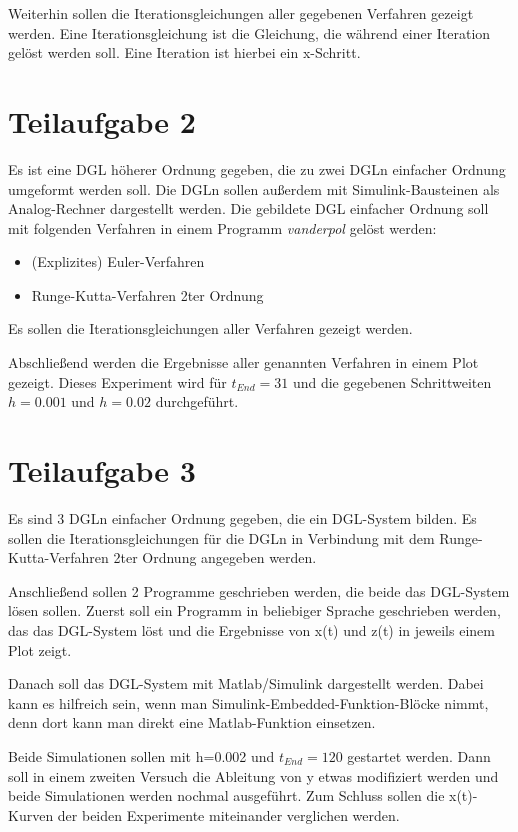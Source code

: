 \documentclass[]{scrartcl}
\begin{document}
Weiterhin sollen die Iterationsgleichungen aller gegebenen Verfahren gezeigt werden. Eine Iterationsgleichung ist die Gleichung, die während einer Iteration gelöst werden soll. Eine Iteration ist hierbei ein x-Schritt.

\section{Teilaufgabe 2}
Es ist eine DGL höherer Ordnung gegeben, die zu zwei DGLn einfacher Ordnung umgeformt werden soll. Die DGLn sollen außerdem mit Simulink-Bausteinen als Analog-Rechner dargestellt werden. Die gebildete DGL einfacher Ordnung soll mit folgenden Verfahren in einem Programm \textit{vanderpol} gelöst werden:

\begin{itemize}
	\item (Explizites) Euler-Verfahren
	\item Runge-Kutta-Verfahren 2ter Ordnung
\end{itemize}

Es sollen die Iterationsgleichungen aller Verfahren gezeigt werden.

Abschließend werden die Ergebnisse aller genannten Verfahren in einem Plot gezeigt. Dieses Experiment wird für $t_{End} = 31$ und die gegebenen Schrittweiten $h=0.001$ und $h=0.02$ durchgeführt.

\section{Teilaufgabe 3}
Es sind 3 DGLn einfacher Ordnung gegeben, die ein DGL-System bilden. Es sollen die Iterationsgleichungen für die DGLn in Verbindung mit dem Runge-Kutta-Verfahren 2ter Ordnung angegeben werden.

Anschließend sollen 2 Programme geschrieben werden, die beide das DGL-System lösen sollen. Zuerst soll ein Programm in beliebiger Sprache geschrieben werden, das das DGL-System löst und die Ergebnisse von x(t) und z(t) in jeweils einem Plot zeigt.

Danach soll das DGL-System mit Matlab/Simulink dargestellt werden. Dabei kann es hilfreich sein, wenn man Simulink-Embedded-Funktion-Blöcke nimmt, denn dort kann man direkt eine Matlab-Funktion einsetzen.

Beide Simulationen sollen mit h=0.002 und $t_{End}=120$ gestartet werden. Dann soll in einem zweiten Versuch die Ableitung von y etwas modifiziert werden und beide Simulationen werden nochmal ausgeführt. Zum Schluss sollen die x(t)-Kurven der beiden Experimente miteinander verglichen werden.
\end{document}
